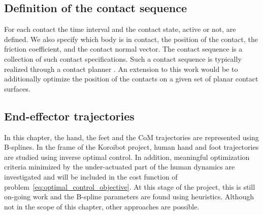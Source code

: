 \subsection{Definition of the contact sequence}

For each contact the time interval and the contact state, active or not, are defined.
We also specify which body is in contact, the position of the contact, the friction coefficient, and the contact normal vector.
The contact sequence is a collection of such contact specifications.
Such a contact sequence is typically realized through a contact planner \cite{Keddar:iros:2014,tonneau2015isrr}.
An extension to this work would be to additionally optimize the position of the contacts on a given set of planar contact surfaces.

\subsection{End-effector trajectories}

In this chapter, the hand, the feet and the CoM trajectories are represented using B-splines.
In the frame of the Koroibot project, human hand and foot trajectories are studied using inverse optimal control.
In addition, meaningful optimization criteria minimized by the under-actuated part of the human dynamics are investigated and will be included in the cost function of problem~\eqref{eq:optimal_control_objective}.
At this stage of the project, this is still on-going work and the B-spline parameters are found using heuristics.
Although not in the scope of this chapter, other approaches are possible.

